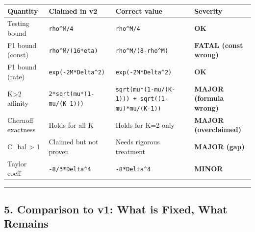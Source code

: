 \documentclass[
  12pt,
]{ctexart}
\begin{document}
\begin{longtable}[]{@{}
  >{\raggedright\arraybackslash}p{}
  >{\raggedright\arraybackslash}p{}
  >{\raggedright\arraybackslash}p{}
  >{\raggedright\arraybackslash}p{}@{}}
\toprule\noalign{}
\begin{minipage}[b]{\linewidth}\raggedright
Quantity
\end{minipage} & \begin{minipage}[b]{\linewidth}\raggedright
Claimed in v2
\end{minipage} & \begin{minipage}[b]{\linewidth}\raggedright
Correct value
\end{minipage} & \begin{minipage}[b]{\linewidth}\raggedright
Severity
\end{minipage} \\
\midrule\noalign{}
\endhead
\bottomrule\noalign{}
\endlastfoot
Testing bound & \texttt{rho\^{}M/4} & \texttt{rho\^{}M/4} &
\textbf{OK} \\
F1 bound (const) & \texttt{rho\^{}M/(16*eta)} &
\texttt{rho\^{}M/(8-rho\^{}M)} & \textbf{FATAL (const wrong)} \\
F1 bound (rate) & \texttt{exp(-2M*Delta\^{}2)} &
\texttt{exp(-2M*Delta\^{}2)} & \textbf{OK} \\
K\textgreater2 affinity & \texttt{2*sqrt(mu*(1-mu/(K-1)))} &
\texttt{sqrt(mu*(1-mu/(K-1)))\ +\ sqrt((1-mu)*mu/(K-1))} & \textbf{MAJOR
(formula wrong)} \\
Chernoff exactness & Holds for all K & Holds for K=2 only &
\textbf{MAJOR (overclaimed)} \\
C\_bal \textgreater{} 1 & Claimed but not proven & Needs rigorous
treatment & \textbf{MAJOR (gap)} \\
Taylor coeff & \texttt{-8/3*Delta\^{}4} & \texttt{-8*Delta\^{}4} &
\textbf{MINOR} \\
\end{longtable}

\begin{center}\rule{0.5\linewidth}{0.5pt}\end{center}

\subsection{5. Comparison to v1: What is Fixed, What
Remains}\label{comparison-to-v1-what-is-fixed-what-remains}
\end{document}
